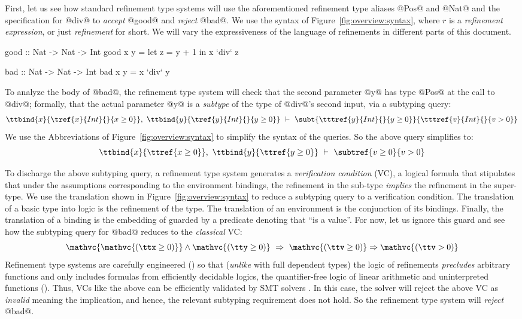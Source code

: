 First, let us see how standard refinement type systems 
\cite{LiquidPLDI08, Knowles10} will 
use
the aforementioned refinement type aliases @Pos@ and @Nat@ 
and the specification for @div@
%
to \emph{accept} @good@ and
\emph{reject} @bad@.
We use the syntax of Figure~\ref{fig:overview:syntax}, where $r$ is a
\emph{refinement expression}, or just \emph{refinement} for short.
We will vary the expressiveness of the language of refinements in
different parts of this document.
%
\begin{code}
    good     :: Nat -> Nat -> Int
    good x y = let z = y + 1 in x `div` z

    bad      :: Nat -> Nat -> Int
    bad x y  = x `div` y
\end{code}

To analyze the body of @bad@, the refinement type system will 
check that the second parameter @y@ has type @Pos@ at the call 
to @div@; formally, that %
the actual parameter @y@ is a \emph{subtype} of the type of 
@div@'s second input, via a subtyping query:
%
$$
 \ttbind{x}{\tref{x}{Int}{}{x \geq 0}},\ 
 \ttbind{y}{\tref{y}{Int}{}{y \geq 0}}
 \ \vdash\
 \subt{\tttref{y}{Int}{}{y \geq 0}}{\tttref{v}{Int}{}{v > 0}}$$
%
We use the Abbreviations of Figure~\ref{fig:overview:syntax} to simplify the 
syntax of the queries.
%
So the above query simplifies to:
$$\ttbind{x}{\ttref{x \geq 0}},\ \ttbind{y}{\ttref{y \geq 0}}\ \vdash\ \subtref{v \geq 0}{v > 0}$$

\spara{Verification Conditions}
To discharge the above subtyping query, a refinement type system
generates a \emph{verification condition} (VC), a logical formula 
that stipulates that under the assumptions corresponding to the 
environment bindings, the refinement in the sub-type \emph{implies} 
the refinement in the super-type.
%
We use the translation \embed{\cdot} shown in Figure~\ref{fig:overview:syntax}
to reduce a subtyping query to a verification condition.
%
The translation of a basic type into logic is the refinement of the type.
The translation of an environment is the conjunction of its bindings.
Finally, the translation of a binding \ttbind{\x}{\typ} is the embedding of \typ 
guarded by a predicate denoting that ``\x is a value''.
%
For now, let us ignore this guard and see how the subtyping query for 
@bad@ reduces to the \emph{classical} VC:
$$\mathvc{\mathvc{(\ttx \geq 0)}} \wedge \mathvc{(\tty \geq 0)}\ \Rightarrow\ \mathvc{(\ttv \geq 0)} \Rightarrow \mathvc{(\ttv > 0)}$$
Refinement type systems are carefully engineered (\Sref{sec:typing}) 
so that (\emph{unlike} with full dependent types) the logic of 
refinements \emph{precludes} arbitrary functions and only includes 
formulas from efficiently decidable logics, \eg the quantifier-free 
logic of linear arithmetic and uninterpreted functions (\logiclang).
Thus, VCs like the above can be efficiently validated by SMT 
solvers \cite{z3}. 
%
In this case, the solver will reject the above VC as \emph{invalid} meaning the 
implication, and hence, the relevant subtyping requirement does not hold.
So the refinement type system will \emph{reject} @bad@.

